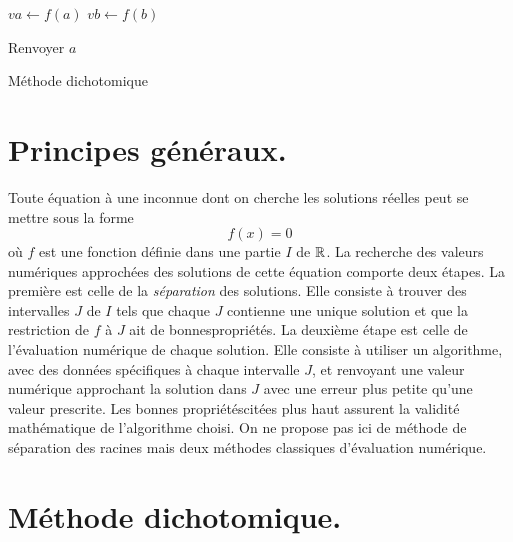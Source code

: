 

\begin{algorithm}
  $va\leftarrow f(a)$\;
  $vb\leftarrow f(b)$\;
  
  Renvoyer $a$\;
  \caption{Méthode dichotomique}
  \label{resolnumequ_1}
\end{algorithm}


\section{Principes généraux.}
Toute équation à une inconnue dont on cherche les solutions réelles peut se mettre sous la forme
\begin{displaymath}
  f(x) = 0
\end{displaymath}
où $f$ est une fonction définie dans une partie $I$ de $\mathbb{R}$. La recherche des valeurs numériques approchées des solutions de cette équation comporte deux étapes.\newline
La première est celle de la \emph{séparation} des solutions. Elle consiste à trouver des intervalles $J$ de $I$ tels que chaque $J$ contienne une unique solution et que la restriction de $f$ à $J$ ait de \og bonnes\fg  propriétés. \newline 
La deuxième étape est celle de l'évaluation numérique de chaque solution. Elle consiste à utiliser un algorithme, avec des données spécifiques à chaque intervalle $J$, et renvoyant une valeur numérique approchant la solution dans $J$ avec une erreur plus petite qu'une valeur prescrite. Les \og bonnes propriétés\fg citées plus haut assurent la validité mathématique de l'algorithme choisi.\newline
On ne propose pas ici de méthode de séparation des racines mais deux méthodes classiques d'évaluation numérique.

\section{Méthode dichotomique.}
